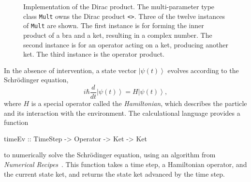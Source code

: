 \documentclass[12pt]{article}
\newcommand{\KeywordTok}[1]{\textcolor[rgb]{0.00,0.44,0.13}{\textbf{{#1}}}}
\newcommand{\DataTypeTok}[1]{\textcolor[rgb]{0.56,0.13,0.00}{{#1}}}
\newcommand{\SpecialCharTok}[1]{\textcolor[rgb]{0.25,0.44,0.63}{{#1}}}
\newcommand{\FunctionTok}[1]{\textcolor[rgb]{0.02,0.16,0.49}{{#1}}}
\newcommand{\OperatorTok}[1]{\textcolor[rgb]{0.40,0.40,0.40}{{#1}}}
\newcommand{\NormalTok}[1]{{#1}}
\newcommand{\ket}[1]{\left| #1 \right\rangle}
\begin{document}
\begin{figure}
\caption{Implementation of the Dirac product.  The multi-parameter type class \DataTypeTok{\texttt{Mult}}
  owns the Dirac product \OperatorTok{\texttt{<>}}.  Three of the twelve instances of \DataTypeTok{\texttt{Mult}}
  are shown.  The first instance is for forming the inner product of a bra and a ket,
  resulting in a complex number.
  The second instance is for an operator acting on a ket, producing another ket.
  The third instance is the operator product.
  }
\label{impdirac}
\end{figure}

In the absence of intervention, a state vector $\ket{\psi(t)}$ evolves according to the
Schr\"odinger equation,
\[
i \hbar \frac{d}{dt} \ket{\psi(t)} = H \ket{\psi(t)} ,
\]
where $H$ is a special operator called the \emph{Hamiltonian},
which describes the particle
and its interaction with the environment.
The calculational language provides a function
\begin{Highlighting}[]
\FunctionTok{timeEv} \SpecialCharTok{::} \DataTypeTok{TimeStep} \SpecialCharTok{->} \DataTypeTok{Operator} \SpecialCharTok{->} \DataTypeTok{Ket} \SpecialCharTok{->} \DataTypeTok{Ket}
\end{Highlighting}
to numerically solve the Schr\"odinger equation, using an algorithm
from \emph{Numerical Recipes}~\cite{numericalrecipes}.
This function takes a time step, a Hamiltonian operator, and the current
state ket, and returns the state ket advanced by the time step.
\end{document}
